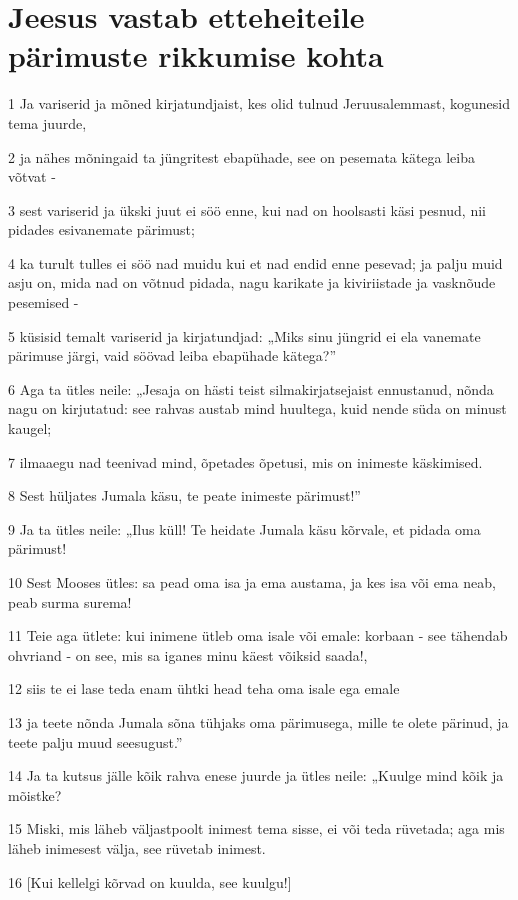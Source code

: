 \section*{Jeesus vastab etteheiteile pärimuste rikkumise kohta}

\par 1 Ja variserid ja mõned kirjatundjaist, kes olid tulnud Jeruusalemmast, kogunesid tema juurde,
\par 2 ja nähes mõningaid ta jüngritest ebapühade, see on pesemata kätega leiba võtvat -
\par 3 sest variserid ja ükski juut ei söö enne, kui nad on hoolsasti käsi pesnud, nii pidades esivanemate pärimust;
\par 4 ka turult tulles ei söö nad muidu kui et nad endid enne pesevad; ja palju muid asju on, mida nad on võtnud pidada, nagu karikate ja kiviriistade ja vasknõude pesemised -
\par 5 küsisid temalt variserid ja kirjatundjad: „Miks sinu jüngrid ei ela vanemate pärimuse järgi, vaid söövad leiba ebapühade kätega?”
\par 6 Aga ta ütles neile: „Jesaja on hästi teist silmakirjatsejaist ennustanud, nõnda nagu on kirjutatud: see rahvas austab mind huultega, kuid nende süda on minust kaugel;
\par 7 ilmaaegu nad teenivad mind, õpetades õpetusi, mis on inimeste käskimised.
\par 8 Sest hüljates Jumala käsu, te peate inimeste pärimust!”
\par 9 Ja ta ütles neile: „Ilus küll! Te heidate Jumala käsu kõrvale, et pidada oma pärimust!
\par 10 Sest Mooses ütles: sa pead oma isa ja ema austama, ja kes isa või ema neab, peab surma surema!
\par 11 Teie aga ütlete: kui inimene ütleb oma isale või emale: korbaan - see tähendab ohvriand - on see, mis sa iganes minu käest võiksid saada!,
\par 12 siis te ei lase teda enam ühtki head teha oma isale ega emale
\par 13 ja teete nõnda Jumala sõna tühjaks oma pärimusega, mille te olete pärinud, ja teete palju muud seesugust.”
\par 14 Ja ta kutsus jälle kõik rahva enese juurde ja ütles neile: „Kuulge mind kõik ja mõistke?
\par 15 Miski, mis läheb väljastpoolt inimest tema sisse, ei või teda rüvetada; aga mis läheb inimesest välja, see rüvetab inimest.
\par 16 [Kui kellelgi kõrvad on kuulda, see kuulgu!]
